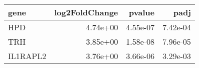 \begin{tabular}{lrrr}
\toprule
    gene &  log2FoldChange &   pvalue &     padj \\
\midrule
     HPD &        4.74e+00 & 4.55e-07 & 7.42e-04 \\
     TRH &        3.85e+00 & 1.58e-08 & 7.96e-05 \\
IL1RAPL2 &        3.76e+00 & 3.66e-06 & 3.29e-03 \\
\bottomrule
\end{tabular}
